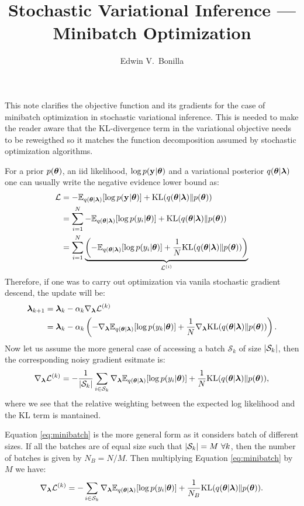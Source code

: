 \documentclass[11pt,a4paper]{article}
\title{Stochastic Variational Inference --- Minibatch Optimization}
\author{Edwin V.~Bonilla}
\newcommand{\vectheta}{\vecS{\theta}}
\newcommand{\param}{\vecS{\lambda}}
\newcommand{\obs}{\vec{y}}
\newcommand{\slike}[1]{\log p(y_{#1}|\vectheta)}
\newcommand{\prior}{p(\vectheta)}
\newcommand{\like}[1]{\log p(\obs_{#1} | \vectheta)}
\newcommand{\post}{q(\vectheta | \param)}
\newcommand{\nelbo}{{\mathcal{L}}}
\newcommand{\singlenelbo}[1]{\nelbo^{(#1)}}
\newcommand{\stepsize}[1]{\alpha_{#1}}
\newcommand{\batch}[1]{{\mathcal{S}}_{#1}}
\newcommand{\batchsize}[1]{\abs{\batch{#1}}}
\begin{document}
\maketitle
This note clarifies the objective function and its gradients for the case of minibatch optimization
in stochastic variational inference. This is needed to make the reader aware that the 
KL-divergence term in the variational objective needs to be reweigthed so it matches the 
function decomposition assumed by stochastic optimization algorithms.

For a prior $\prior$, an iid likelihood, $\like{}$ and a variational posterior 
$\post$ one can usually write the negative evidence lower bound as:
\begin{align}
\nelbo &= - \expectation{\post}{\like{}} + \kl{\post}{\prior} \\
&= \sum_{i=1}^{N} - \expectation{\post}{\slike{i}} +  \kl{\post}{\prior}\\
&= \sum_{i=1}^{N}  \underbrace{\left(- \expectation{\post}{\slike{i}} + \frac{1}{N}\kl{\post}{\prior} \right)}_{\singlenelbo{i}}
\end{align}
Therefore, if one was to carry out optimization via vanila stochastic gradient descend, the update will be:
\begin{align}
\param_{k+1} &= \param_k - \stepsize{k} \grad_{\param}{\singlenelbo{k}} \\
&= \param_k - \stepsize{k} \left(- \grad_{\param}{\expectation{\post}{\slike{k}}} + \frac{1}{N} \grad_{\param} \kl{\post}{\prior} \right) \text{.}
\end{align}
Now let us assume the more general case of accessing a batch $\batch{k}$ of size $\batchsize{k}$, then
the corresponding noisy gradient esitmate is:
\begin{align}
\label{eq:minibatch}
	\grad_{\param}\singlenelbo{k} = - \frac{1}{\batchsize{k}}\sum_{i \in \batch{k}} 
	 \grad_{\param} \expectation{\post}{\slike{i}} + \frac{1}{N}  \kl{\post}{\prior} \text{,}
\end{align}
where we see that the relative weighting between the expected log likelihood and the KL term is mantained. 

Equation \eqref{eq:minibatch} is the more general form as it considers batch of different sizes.
If all the batches are of equal size such that $\batchsize{k}=M \ \forall k$, then the number of 
batches is given by $N_B = N/M$.  Then multiplying Equation  \eqref{eq:minibatch} by $M$ we have:
\begin{align}
	\grad_{\param}\singlenelbo{k} = - \sum_{i \in \batch{k}} 
	\grad_{\param} \expectation{\post}{\slike{i}} + \frac{1}{N_B}  \kl{\post}{\prior}\text{.}
\end{align}
\end{document}
